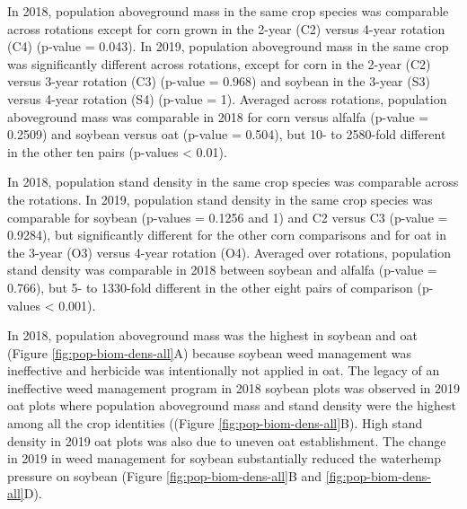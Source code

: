 \documentclass[
]{article}
\begin{document}
In 2018, population aboveground mass in the same crop species was comparable across rotations except for corn grown in the 2-year (C2) versus 4-year rotation (C4) (p-value = 0.043). In 2019, population aboveground mass in the same crop was significantly different across rotations, except for corn in the 2-year (C2) versus 3-year rotation (C3) (p-value = 0.968) and soybean in the 3-year (S3) versus 4-year rotation (S4) (p-value = 1). Averaged across rotations, population aboveground mass was comparable in 2018 for corn versus alfalfa (p-value = 0.2509) and soybean versus oat (p-value = 0.504), but 10- to 2580-fold different in the other ten pairs (p-values \textless{} 0.01).

In 2018, population stand density in the same crop species was comparable across the rotations. In 2019, population stand density in the same crop species was comparable for soybean (p-values = 0.1256 and 1) and C2 versus C3 (p-value = 0.9284), but significantly different for the other corn comparisons and for oat in the 3-year (O3) versus 4-year rotation (O4). Averaged over rotations, population stand density was comparable in 2018 between soybean and alfalfa (p-value = 0.766), but 5- to 1330-fold different in the other eight pairs of comparison (p-values \textless{} 0.001).

In 2018, population aboveground mass was the highest in soybean and oat (Figure \ref{fig:pop-biom-dens-all}A) because soybean weed management was ineffective and herbicide was intentionally not applied in oat. The legacy of an ineffective weed management program in 2018 soybean plots was observed in 2019 oat plots where population aboveground mass and stand density were the highest among all the crop identities ((Figure \ref{fig:pop-biom-dens-all}B). High stand density in 2019 oat plots was also due to uneven oat establishment. The change in 2019 in weed management for soybean substantially reduced the waterhemp pressure on soybean (Figure \ref{fig:pop-biom-dens-all}B and \ref{fig:pop-biom-dens-all}D).
\end{document}

